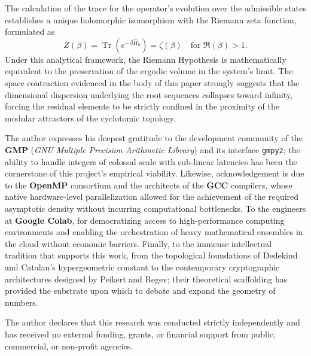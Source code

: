 \documentclass{article}
\numberwithin{equation}{section}
\theoremstyle{plain}
\theoremstyle{definition}
\begin{document}
The calculation of the trace for the operator's evolution over the admissible states establishes a unique holomorphic isomorphism with the Riemann zeta function, formulated as
\begin{equation}
    Z(\beta) = \operatorname{Tr}(e^{-\beta \hat{H}_0}) = \zeta(\beta) \quad \text{for } \Re(\beta) > 1.
\end{equation}
Under this analytical framework, the Riemann Hypothesis is mathematically equivalent to the preservation of the ergodic volume in the system's limit. The space contraction evidenced in the body of this paper strongly suggests that the dimensional dispersion underlying the root sequences collapses toward infinity, forcing the residual elements to be strictly confined in the proximity of the modular attractors of the cyclotomic topology.

\begin{ack}
The author expresses his deepest gratitude to the development community of the \textbf{GMP} (\textit{GNU Multiple Precision Arithmetic Library}) and its interface \texttt{gmpy2}; the ability to handle integers of colossal scale with sub-linear latencies has been the cornerstone of this project's empirical viability. Likewise, acknowledgement is due to the \textbf{OpenMP} consortium and the architects of the \textbf{GCC} compilers, whose native hardware-level parallelization allowed for the achievement of the required asymptotic density without incurring computational bottlenecks. To the engineers at \textbf{Google Colab}, for democratizing access to high-performance computing environments and enabling the orchestration of heavy mathematical ensembles in the cloud without economic barriers. Finally, to the immense intellectual tradition that supports this work, from the topological foundations of Dedekind and Catalan’s hypergeometric constant to the contemporary cryptographic architectures designed by Peikert and Regev; their theoretical scaffolding has provided the substrate upon which to debate and expand the geometry of numbers.
\end{ack}

\begin{funding}
The author declares that this research was conducted strictly independently and has received no external funding, grants, or financial support from public, commercial, or non-profit agencies.
\end{funding}
\end{document}
